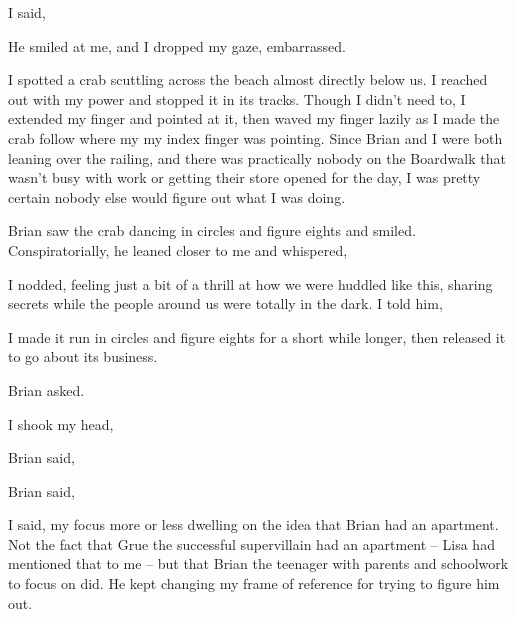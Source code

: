  I said, 

He smiled at me, and I dropped my gaze, embarrassed.

I spotted a crab scuttling across the beach almost directly below us. I reached out with my power and stopped it in its tracks. Though I didn't need to, I extended my finger and pointed at it, then waved my finger lazily as I made the crab follow where my my index finger was pointing. Since Brian and I were both leaning over the railing, and there was practically nobody on the Boardwalk that wasn't busy with work or getting their store opened for the day, I was pretty certain nobody else would figure out what I was doing.

Brian saw the crab dancing in circles and figure eights and smiled. Conspiratorially, he leaned closer to me and whispered, 

I nodded, feeling just a bit of a thrill at how we were huddled like this, sharing secrets while the people around us were totally in the dark. I told him, 

I made it run in circles and figure eights for a short while longer, then released it to go about its business.

 Brian asked.

I shook my head, 

 Brian said, 


 Brian said, 

 I said, my focus more or less dwelling on the idea that Brian had an apartment. Not the fact that Grue the successful supervillain had an apartment -- Lisa had mentioned that to me -- but that Brian the teenager with parents and schoolwork to focus on did. He kept changing my frame of reference for trying to figure him out.

